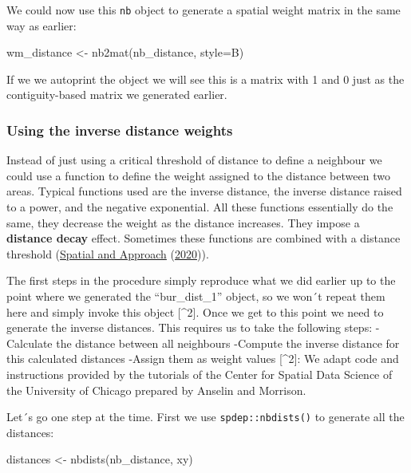 \documentclass[
  krantz2]{krantz}
\makeatletter
\newenvironment{Shaded}{\begin{snugshade}}{\end{snugshade}}
\newcommand{\AttributeTok}[1]{\textcolor[rgb]{0.61,0.61,0.61}{#1}}
\newcommand{\FunctionTok}[1]{\textcolor[rgb]{0,0,0}{#1}}
\newcommand{\NormalTok}[1]{#1}
\newcommand{\OtherTok}[1]{\textcolor[rgb]{0.37,0.37,0.37}{#1}}
\newcommand{\StringTok}[1]{\textcolor[rgb]{0.5,0.5,0.5}{#1}}
\newenvironment{kframe}{%
\medskip{}
\setlength{\fboxsep}{.8em}
 \def\at@end@of@kframe{}%
 \ifinner\ifhmode%
  \def\at@end@of@kframe{\end{minipage}}%
  \begin{minipage}{\columnwidth}%
 \fi\fi%
 \def\FrameCommand##1{\hskip\@totalleftmargin \hskip-\fboxsep
 \colorbox{shadecolor}{##1}\hskip-\fboxsep
     \hskip-\linewidth \hskip-\@totalleftmargin \hskip\columnwidth}%
 \MakeFramed {\advance\hsize-\width
   \@totalleftmargin\z@ \linewidth\hsize
   \@setminipage}}%
 {\par\unskip\endMakeFramed%
 \at@end@of@kframe}
\renewenvironment{Shaded}{\begin{kframe}}{\end{kframe}}
\makeatother
\begin{document}
We could now use this \texttt{nb} object to generate a spatial weight matrix in the same way as earlier:

\begin{Shaded}
\begin{Highlighting}[]
\NormalTok{wm\_distance }\OtherTok{\textless{}{-}} \FunctionTok{nb2mat}\NormalTok{(nb\_distance, }\AttributeTok{style=}\StringTok{\textquotesingle{}B\textquotesingle{}}\NormalTok{)}
\end{Highlighting}
\end{Shaded}

If we we autoprint the object we will see this is a matrix with 1 and 0 just as the contiguity-based matrix we generated earlier.

\hypertarget{using-the-inverse-distance-weights}{%
\subsubsection{Using the inverse distance weights}\label{using-the-inverse-distance-weights}}

Instead of just using a critical threshold of distance to define a neighbour we could use a function to define the weight assigned to the distance between two areas. Typical functions used are the inverse distance, the inverse distance raised to a power, and the negative exponential. All these functions essentially do the same, they decrease the weight as the distance increases. They impose a \textbf{distance decay} effect. Sometimes these functions are combined with a distance threshold (\protect\hyperlink{ref-Haining_2020}{Spatial and Approach} (\protect\hyperlink{ref-Haining_2020}{2020})).

The first steps in the procedure simply reproduce what we did earlier up to the point where we generated the ``bur\_dist\_1'' object, so we won´t repeat them here and simply invoke this object {[}\^{}2{]}. Once we get to this point we need to generate the inverse distances. This requires us to take the following steps:
-Calculate the distance between all neighbours
-Compute the inverse distance for this calculated distances
-Assign them as weight values
{[}\^{}2{]}: We adapt code and instructions provided by the tutorials of the Center for Spatial Data Science of the University of Chicago prepared by Anselin and Morrison.

Let´s go one step at the time. First we use \texttt{spdep::nbdists()} to generate all the distances:

\begin{Shaded}
\begin{Highlighting}[]
\NormalTok{distances }\OtherTok{\textless{}{-}} \FunctionTok{nbdists}\NormalTok{(nb\_distance, xy)}
\end{Highlighting}
\end{Shaded}
\end{document}
